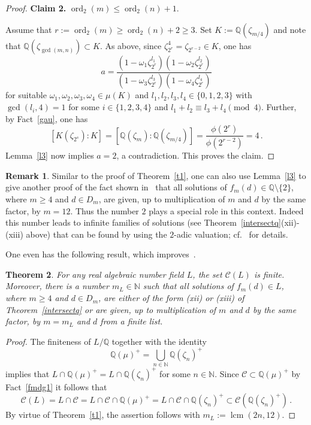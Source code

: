 \documentclass[a4paper]{amsart}
\newtheorem{theorem}{Theorem}[section]
\theoremstyle{definition}
\newtheorem{rem}[theorem]{Remark}
\numberwithin{equation}{section}
\numberwithin{theorem}{section}
\begin{document}
\begin{proof}
{\bf Claim 2.} $\operatorname{ord}_2(m)\leq
\operatorname{ord}_2(n)+1$. 

Assume that $r:=\operatorname{ord}_2(m)\geq
\operatorname{ord}_2(n)+2\geq 3$. Set
$K:={\mathbb{Q}}(\zeta_{m/4})$ and note that ${\mathbb{Q}}(\zeta_{\operatorname{gcd}(m,n)})\subset
K$. As above, since $\zeta_{2^{r}}^4=\zeta_{2^{r-2}}\in K$, one has 
$$
a=\frac{(1-\omega_1\zeta_{2^r}^{l_1})(1-\omega_2\zeta_{2^r}^{l_2})}{(1-\omega_3\zeta_{2^r}^{l_3})(1-\omega_4\zeta_{2^r}^{l_4})}
$$ 
for suitable $\omega_1,\omega_2,\omega_3,\omega_4\in\mu(K)$ and
$l_1,l_2,l_3,l_4\in\{0,1,2,3\}$ with $\operatorname{gcd}(l_i,4)=1$
for some $i\in\{1,2,3,4\}$ and $l_1+l_2\equiv l_3+l_4 \pmod
4$. Further, by Fact~\ref{gau}, one has
 $$[K(\zeta_{2^{s}}):K]=[{\mathbb{Q}}(\zeta_{m}):{\mathbb{Q}}(\zeta_{m/4})]=\frac{\phi(2^r)}{\phi(2^{r-2})}=4\,.$$ 
Lemma~\ref{l3} now implies $a=2$, a contradiction. This proves the
claim. 
\end{proof}

\begin{rem}
Similar to the proof of Theorem~\ref{t1}, one can also use
Lemma~\ref{l3} to give another proof of the fact shown in~\cite{GG} that all solutions of $f_{m}(d)\in{\mathbb{Q}}\setminus\{2\}$, where $m\geq 4$ and
$d\in D_{m}$, are given, up to multiplication of $m$
and $d$ by the same factor, by $m=12$. Thus the number $2$ plays a special role
in this context. Indeed this number leads to infinite families of
solutions (see Theorem~\ref{intersectq}(xii)-(xiii) above) that can be
found by using the $2$-adic valuation;
cf.~\cite{GG} for details.   
\end{rem}

One even has the following result, which improves~\cite[Thm.~ 4.19]{H5}.

\begin{theorem}\label{algcoro}
For any real algebraic number field $L$, the set
$\mathcal{C}(L)$ is finite. Moreover, there is a number
$m_L\in{\mathbb{N}}$ such that all solutions of $f_{m}(d)\in L$, where $m\geq 4$ and
$d\in D_{m}$, are either of the form
(xii) or (xiii) of Theorem~\ref{intersectq} or are  given, up to multiplication of $m$
and $d$ by the same factor, by $m=m_L$ and $d$
from a finite list. 
\end{theorem}

\begin{proof} 
The finiteness of $L/{\mathbb{Q}}$ together with  the identity
$${\mathbb{Q}}(\mu)^+=\bigcup_{n\in{\mathbb{N}}}{\mathbb{Q}}(\zeta_n)^+$$ implies that $L \cap {\mathbb{Q}}(\mu)^+ = L\cap {\mathbb{Q}}(\zeta_n)^+$ for
some $n\in{\mathbb{N}}$. Since $\mathcal{C} \subset {\mathbb{Q}}(\mu)^+$ by Fact~\ref{fmdg1} it follows that 
$$
\mathcal{C}(L)  = L \cap \mathcal{C}  = L \cap \mathcal{C} \cap {\mathbb{Q}}(\mu)^+=  L\cap \mathcal{C}\cap {\mathbb{Q}}(\zeta_n)^+ \subset
\mathcal{C}({\mathbb{Q}}(\zeta_n)^+)\,.
$$
By virtue of Theorem~\ref{t1}, the assertion follows with $m_L:=\operatorname{lcm}(2n,12)$.
\end{proof} 
\end{document}

